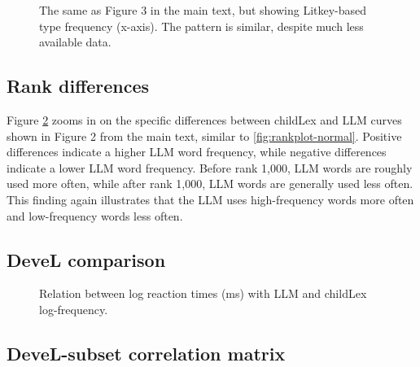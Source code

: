 \documentclass[manuscript]{stjour}
\begin{document}
\begin{figure}[!htbp]
    \caption{The same as Figure 3 in the main text, but showing Litkey-based type frequency (x-axis). The pattern is similar, despite much less available data. }
    \label{fig:corlitkey}
\end{figure}

\clearpage


\subsection{Rank differences}

Figure \ref{fig:rankplot-difs} zooms in on the specific differences between childLex and LLM curves shown in Figure 2 from the main text, similar to \ref{fig:rankplot-normal}. Positive differences indicate a higher LLM word frequency, while negative differences indicate a lower LLM word frequency. Before rank 1,000, LLM words are roughly used more often, while after rank 1,000, LLM words are generally used less often. This finding again illustrates that the LLM uses high-frequency words more often and low-frequency words less often.  

\begin{figure}[!htbp]
    \label{fig:rankplot-difs}
\end{figure}

\clearpage

\subsection{DeveL comparison}

\begin{figure}[!htbp]
    \centering
    \caption{Relation between log reaction times (ms) with LLM and childLex log-frequency.}
\label{fig:rt-f-scatter}
\end{figure}

\clearpage

\subsection{DeveL-subset correlation matrix}
\end{document}
